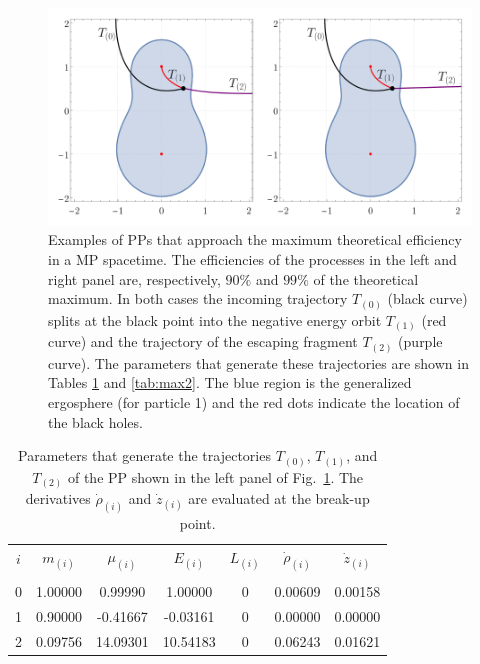 \begin{figure}[!ht]
  \centering
  \includegraphics[width=\linewidth]{img/penrose_binaries/fig11.pdf}
  \caption{Examples of PPs that approach the maximum theoretical efficiency in a \ac{MP} spacetime. The efficiencies of the processes in the left and right panel are, respectively, $90 \%$ and $99 \%$ of the theoretical maximum. In both cases the incoming trajectory $T_{(0)}$ (black curve) splits at the black point into the negative energy orbit $T_{(1)}$ (red curve) and the trajectory of the escaping fragment $T_{(2)}$ (purple curve). The parameters that generate these trajectories are shown in Tables \ref{tab:max1} and \ref{tab:max2}. The blue region is the generalized ergosphere (for particle 1) and the red dots indicate the location of the black holes.}
  \label{fig:examplemax1}
\end{figure}

\begin{table}[h]
  \centering
  \begin{tabular}{ccccccc}
    \hline\hline
    $i$ & $m_{(i)}$ & $\mu_{(i)}$ & $E_{(i)}$ & $L_{(i)}$ & $\dot{\rho}_{(i)}$ & $\dot{z}_{(i)}$ \\ \vspace{-0.3cm} \\
    0   & 1.00000   & 0.99990     & 1.00000   & 0         & 0.00609            & 0.00158         \\
    1   & 0.90000   & -0.41667    & -0.03161  & 0         & 0.00000            & 0.00000         \\
    2   & 0.09756   & 14.09301    & 10.54183  & 0         & 0.06243            & 0.01621         \\
    \hline\hline
  \end{tabular}
  \caption{Parameters that generate the trajectories $T_{(0)}$, $T_{(1)}$, and $T_{(2)}$ of the \ac{PP} shown in the left panel of Fig.~\ref{fig:examplemax1}. The derivatives $\dot{\rho}_{(i)}$ and $\dot{z}_{(i)}$ are evaluated at the break-up point.
  }
  \label{tab:max1}
\end{table}

